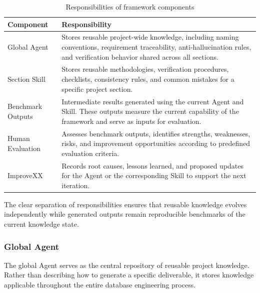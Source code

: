 \begin{table}[H]
	\centering
	\caption{Responsibilities of framework components}
	\label{tab:components}

	\begin{tabularx}{\linewidth}{>{\raggedright\arraybackslash}p{3.5cm}X}
		\toprule
		\textbf{Component} &
		\textbf{Responsibility}
		\\
		\midrule

		Global Agent       &
		Stores reusable project-wide knowledge, including naming conventions, requirement traceability, anti-hallucination rules, and verification behavior shared across all sections.
		\\

		Section Skill      &
		Stores reusable methodologies, verification procedures, checklists, consistency rules, and common mistakes for a specific project section.
		\\

		Benchmark Outputs  &
		Intermediate results generated using the current Agent and Skill. These outputs measure the current capability of the framework and serve as inputs for evaluation.
		\\

		Human Evaluation   &
		Assesses benchmark outputs, identifies strengths, weaknesses, risks, and improvement opportunities according to predefined evaluation criteria.
		\\

		ImproveXX          &
		Records root causes, lessons learned, and proposed updates for the Agent or the corresponding Skill to support the next iteration.
		\\

		\bottomrule
	\end{tabularx}

\end{table}

The clear separation of responsibilities ensures that reusable knowledge evolves independently while generated outputs remain reproducible benchmarks of the current knowledge state.

\subsubsection{Global Agent}

The global Agent serves as the central repository of reusable project knowledge. Rather than describing how to generate a specific deliverable, it stores knowledge applicable throughout the entire database engineering process.

